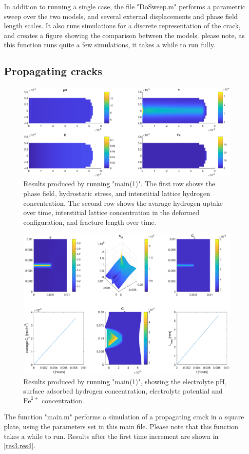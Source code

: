 \documentclass[3p]{elsarticle} %
\begin{document}
In addition to running a single case, the file "DoSweep.m" performs a parametric sweep over the two models, and several external displacements and phase field length scales. It also runs simulations for a discrete representation of the crack, and creates a figure showing the comparison between the models. please note, as this function runs quite a few simulations, it takes a while to run fully.


\subsection{Propagating cracks}
\begin{figure}
	\centering
	\includegraphics[width=16cm]{./Figures/Res_Static4.eps}
	\caption{Results produced by running "main(1)". The first row shows the phase field, hydrostatic stress, and interstitial lattice hydrogen concentration. The second row shows the avarage hydrogen uptake over time, interstitial lattice concentration in the deformed configuration, and fracture length over time.}
	\label{res3}
\end{figure}
\begin{figure}
	\centering
	\includegraphics[width=12cm]{./Figures/Res_Static3.eps}
	\caption{Results produced by running "main(1)", showing the electrolyte pH, surface adsorbed hydrogen concentration, electrolyte potential and $\mathrm{Fe}^{2+}$ concentration.}
	\label{res4}
\end{figure}
The function "main.m" performs a simulation of a propagating crack in a square plate, using the parameters set in this main file. Please note that this function takes a while to run. Results after the first time increment are shown in \cref{res3,res4}. 


\end{document}
